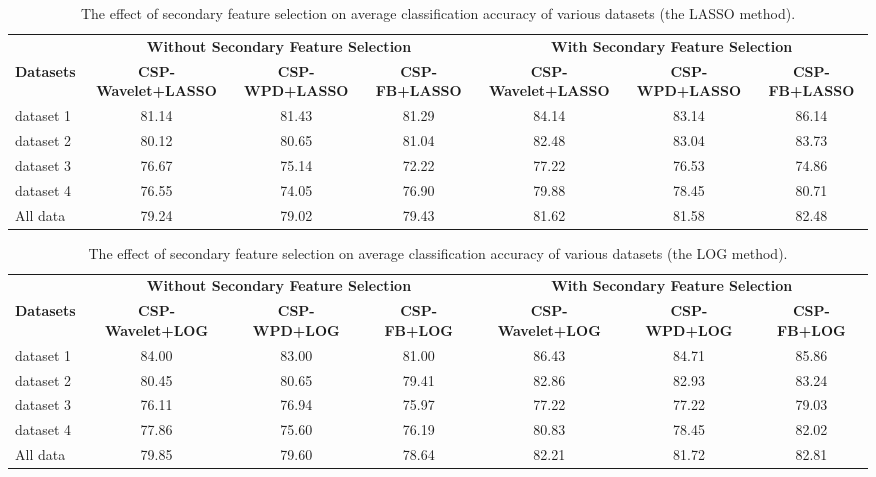 
\begin{table}[htbp]
\centering
\small
\caption{The effect of secondary feature selection on average classification accuracy of various datasets (the LASSO method).}
\label{tab:table6_lasso_secondary}
\begin{tabular}{lcccccc}
\toprule
 & \multicolumn{3}{c}{\textbf{Without Secondary Feature Selection}} & \multicolumn{3}{c}{\textbf{With Secondary Feature Selection}} \\
\cmidrule(lr){2-4} \cmidrule(lr){5-7}
\textbf{Datasets} & \textbf{CSP-Wavelet+LASSO} & \textbf{CSP-WPD+LASSO} & \textbf{CSP-FB+LASSO} & \textbf{CSP-Wavelet+LASSO} & \textbf{CSP-WPD+LASSO} & \textbf{CSP-FB+LASSO} \\
\midrule
dataset 1 & 81.14 & 81.43 & 81.29 & 84.14 & 83.14 & 86.14 \\
dataset 2 & 80.12 & 80.65 & 81.04 & 82.48 & 83.04 & 83.73 \\
dataset 3 & 76.67 & 75.14 & 72.22 & 77.22 & 76.53 & 74.86 \\
dataset 4 & 76.55 & 74.05 & 76.90 & 79.88 & 78.45 & 80.71 \\
\midrule
All data & 79.24 & 79.02 & 79.43 & 81.62 & 81.58 & 82.48 \\
\bottomrule
\end{tabular}
\end{table}

\begin{table}[htbp]
\centering
\small
\caption{The effect of secondary feature selection on average classification accuracy of various datasets (the LOG method).}
\label{tab:table7_log_secondary}
\begin{tabular}{lcccccc}
\toprule
 & \multicolumn{3}{c}{\textbf{Without Secondary Feature Selection}} & \multicolumn{3}{c}{\textbf{With Secondary Feature Selection}} \\
\cmidrule(lr){2-4} \cmidrule(lr){5-7}
\textbf{Datasets} & \textbf{CSP-Wavelet+LOG} & \textbf{CSP-WPD+LOG} & \textbf{CSP-FB+LOG} & \textbf{CSP-Wavelet+LOG} & \textbf{CSP-WPD+LOG} & \textbf{CSP-FB+LOG} \\
\midrule
dataset 1 & 84.00 & 83.00 & 81.00 & 86.43 & 84.71 & 85.86 \\
dataset 2 & 80.45 & 80.65 & 79.41 & 82.86 & 82.93 & 83.24 \\
dataset 3 & 76.11 & 76.94 & 75.97 & 77.22 & 77.22 & 79.03 \\
dataset 4 & 77.86 & 75.60 & 76.19 & 80.83 & 78.45 & 82.02 \\
\midrule
All data & 79.85 & 79.60 & 78.64 & 82.21 & 81.72 & 82.81 \\
\bottomrule
\end{tabular}
\end{table}

